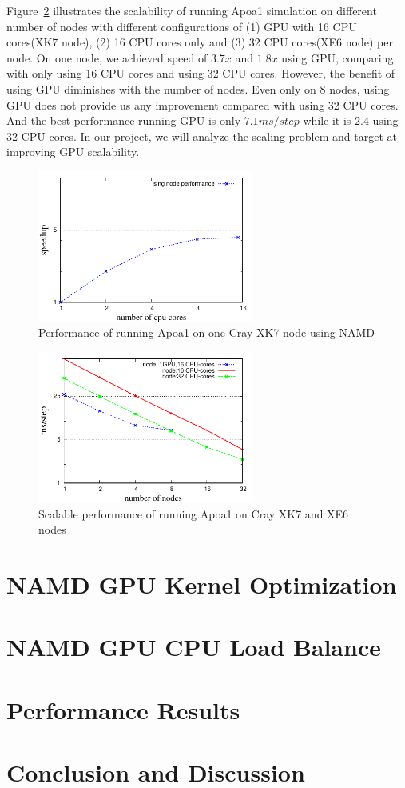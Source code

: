 \documentclass[11pt,onecolumn]{article}
\begin{document}
Figure~\ref{figs:apoa1-gpu-scale-JYC} illustrates the scalability of 
running Apoa1 simulation on different number of nodes with different configurations of 
(1) GPU with 16 CPU cores(XK7 node), (2) 16 CPU cores only and (3) 32 CPU cores(XE6 node) per node.
On one node, we achieved speed of $3.7x$ and $1.8x$ using GPU, comparing with only using 16 CPU cores
and using 32 CPU cores. However, the benefit of using GPU diminishes with the number of nodes.
Even only on 8 nodes, using GPU does not provide us any improvement compared with using 32 CPU cores.
And the best performance running GPU is only $7.1ms/step$ while it is $2.4$ using 32 CPU cores.
In our project, we will analyze the scaling problem and target at improving GPU scalability.


\begin{figure}[h]
\centering
\includegraphics[width=2.8in]{figs/gpu-singlenode}
\caption{Performance of running Apoa1 on one Cray XK7 node using NAMD}
\label{figs:apoa1-gpu-singlenode-JYC}
\vspace{-0.2cm}
\end{figure}

\begin{figure}[h]
\centering
\includegraphics[width=2.8in]{figs/cpu-gpu-jyc-apoa1}
\caption{Scalable performance of running Apoa1 on Cray XK7 and XE6 nodes }
\label{figs:apoa1-gpu-scale-JYC}
\vspace{-0.2cm}
\end{figure}



\section{NAMD GPU Kernel Optimization}


\section{NAMD GPU CPU Load Balance}


\section{Performance Results}


\section{Conclusion and Discussion}




\end{document}
